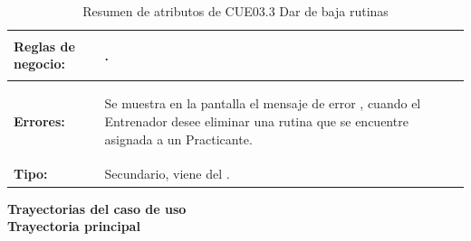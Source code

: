 \begin{table}[H]
\begin{tabular}{| l | p{12 cm} |}
\hline
\textbf{Reglas de negocio:} & \vspace{-2mm}	%
							\begin{compactitem}
								\item \nameref{rn:RNR24}.
							\end{compactitem}\\							
\hline
\textbf{Errores:} &	\vspace{-2mm}	%
					\begin{compactitem}
						\setlength\itemsep{-0.25em}
						\item Se muestra en la pantalla \nameref{pant:IUE03} el mensaje de error \nameref{msj:MSG09}, cuando el Entrenador desee eliminar una rutina que se encuentre asignada a un Practicante.
					\end{compactitem}\\
\hline
\textbf{Tipo:} & Secundario, viene del \nameref{cu:CUE03}.\\
\hline	
\end{tabular}
\caption{Resumen de atributos de CUE03.3 Dar de baja rutinas}
\label{tab:CUE033}
\end{table} 

\textbf{\textcolor[rgb]{0, 0, 0.545098}{Trayectorias del caso de uso}} \\

\textbf{\large{Trayectoria principal}}

